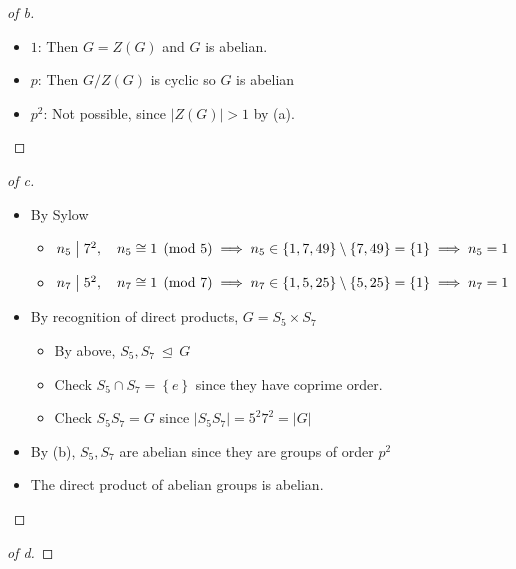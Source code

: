 \begin{solution}
\begin{proof}[of b]
\begin{itemize}
\tightlist
\item
  \(1\): Then \(G = Z(G)\) and \(G\) is abelian.
\item
  \(p\): Then \(G/Z(G)\) is cyclic so \(G\) is abelian
\item
  \(p^2\): Not possible, since \({\left\lvert {Z(G)} \right\rvert} > 1\)
  by (a).
\end{itemize}

\end{proof}

\begin{proof}[of c]

\envlist

\begin{itemize}
\item
  By Sylow

  \begin{itemize}
  \tightlist
  \item
    \(n_5 \bigm|7^2,\quad n_5\cong 1\pmod 5 \implies n_5\in\left\{{1, 7, 49}\right\}\setminus\left\{{7, 49}\right\} = \left\{{1}\right\} \implies n_5 = 1\)
  \item
    \(n_7 \bigm|5^2, \quad n_7 \cong 1 \pmod 7 \implies n_7 \in \left\{{1, 5, 25}\right\}\setminus\left\{{5, 25}\right\} =\left\{{1}\right\} \implies n_7 = 1\)
  \end{itemize}
\item
  By recognition of direct products, \(G = S_5 \times S_7\)

  \begin{itemize}
  \tightlist
  \item
    By above, \(S_5, S_7{~\trianglelefteq~}G\)
  \item
    Check \(S_5\cap S_7 = \left\{{e}\right\}\) since they have coprime
    order.
  \item
    Check \(S_5S_7 = G\) since
    \({\left\lvert {S_5 S_7} \right\rvert} = 5^2 7^2 = {\left\lvert {G} \right\rvert}\)
  \end{itemize}
\item
  By (b), \(S_5, S_7\) are abelian since they are groups of order
  \(p^2\)
\item
  The direct product of abelian groups is abelian.
\end{itemize}

\end{proof}

\begin{proof}[of d]

\envlist


\end{proof}
\end{solution}
